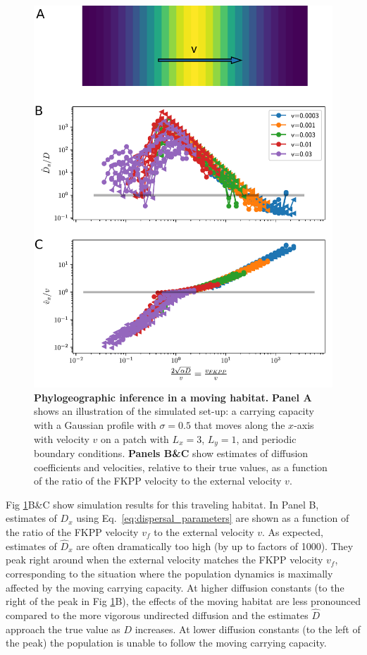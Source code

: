 \documentclass[aps,rmp, twocolumn]{revtex4}
\newcommand{\vfkpp}{v_f}
\begin{document}
\begin{figure}[tb]
    \includegraphics[width=\columnwidth]{figures/Fig5}
    \caption{\label{fig:traveling_wave}{\bf Phylogeographic inference in a moving habitat.}
    {\bf Panel A} shows an illustration of the simulated set-up: a carrying capacity with a Gaussian profile with $\sigma=0.5$ that moves along the $x$-axis with velocity $v$ on a patch with $L_x=3$, $L_y=1$, and periodic boundary conditions.
    {\bf Panels B\&C} show estimates of diffusion coefficients and velocities, relative to their true values, as a function of the ratio of the FKPP velocity to the external velocity $v$. }
\end{figure}


Fig \ref{fig:traveling_wave}B\&C show simulation results for this traveling habitat. In Panel B, estimates of $D_x$ using Eq.~\ref{eq:dispersal_parameters} are shown as a function of the ratio of the FKPP velocity $v_f$ to the external velocity $v$.
As expected, estimates of $\hat{D}_x$ are often dramatically too high (by up to factors of 1000).
They peak right around when the external velocity matches the FKPP velocity $\vfkpp$, corresponding to the situation where the population dynamics is maximally affected by the moving carrying capacity.
At higher diffusion constants (to the right of the peak in Fig \ref{fig:traveling_wave}B), the effects of the moving habitat are less pronounced compared to the more vigorous undirected diffusion and the estimates $\hat{D}$ approach the true value as $D$ increases.
At lower diffusion constants (to the left of the peak) the population is unable to follow the moving carrying capacity.
\end{document}
